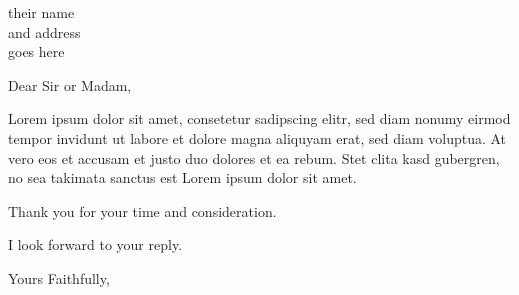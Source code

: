 \documentclass[a4paper]{letter}
\begin{document}
\begin{letter}{their name \\ and address \\ goes here}
\opening{Dear Sir or Madam,}

Lorem ipsum dolor sit amet, consetetur sadipscing elitr, sed diam nonumy eirmod
tempor invidunt ut labore et dolore magna aliquyam erat, sed diam voluptua. At
vero eos et accusam et justo duo dolores et ea rebum. Stet clita kasd
gubergren, no sea takimata sanctus est Lorem ipsum dolor sit amet.


Thank you for your time and consideration.

I look forward to your reply.

\closing{Yours Faithfully,}




\end{letter}
\end{document}
